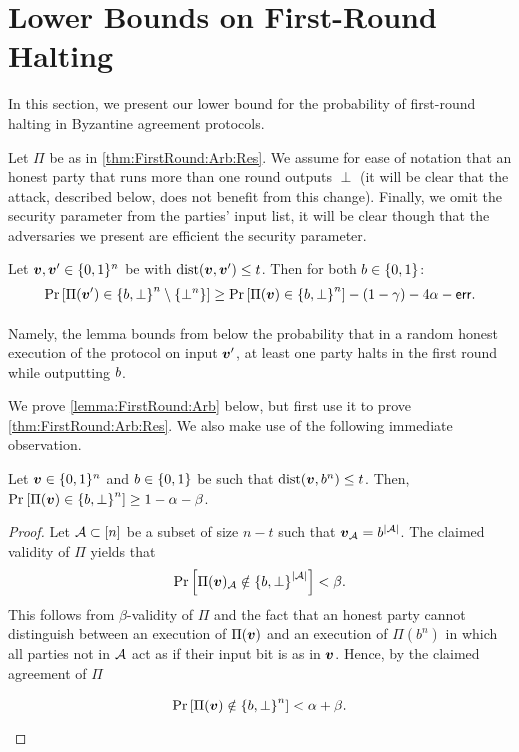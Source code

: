 

\section{Lower Bounds on First-Round Halting}\label{sec:FirstRound}

In this section, we present our lower bound for the probability of first-round halting in Byzantine agreement protocols.
\begin{theorem}\label{thm:FirstRound:Arb:Res}
\ThmFirstRoundArb
\end{theorem}

Let $\Pi$ be as in \cref{thm:FirstRound:Arb:Res}. We assume for ease of notation that an honest party that runs more than one round outputs $\perp$ (it will be clear that the attack, described  below, does not benefit from this change). Finally, we omit the security parameter from the parties' input list, it will be clear though that the adversaries we present are efficient \wrt the security parameter.


\begin{lemma}\label{lemma:FirstRound:Arb}
	Let ${ \boldsymbol{v}},{ \boldsymbol{v}}' \in {\{0,1\}^n}$ be with $\mathrm{dist}({ \boldsymbol{v}},{ \boldsymbol{v}}') \le t$. Then for both $b\in \{0,1\}$:
	\[
	\Pr_{}\left[\Pi({ \boldsymbol{v}}') \in  \left\{b,\bot\right\}^n  \setminus \left\{\bot^n\right\}\right] \ge	\Pr_{}\left[\Pi({ \boldsymbol{v}}) \in \left\{b,\bot\right\}^n\right] - (1- \gamma) - 4\alpha - \mathsf{err}.
	\]
\end{lemma}
Namely, the lemma bounds from below the probability that in a random honest execution of the protocol on input ${ \boldsymbol{v}}'$, at least one party halts in the first round while outputting $b$.

We prove \cref{lemma:FirstRound:Arb} below, but first use it to prove \cref{thm:FirstRound:Arb:Res}. We also make use of the following immediate observation.
\begin{claim}\label{claim:FirstRoundound:Arb:Validity}
Let ${ \boldsymbol{v}} \in {\{0,1\}^n}$  and $b \in \{0,1\}$ be such that $\mathrm{dist}({ \boldsymbol{v}},b^n) \le t$. Then,
$\Pr_{}\left[\Pi({ \boldsymbol{v}}) \in \left\{b,\bot\right\}^n\right] \ge 1 - \alpha - \beta$.
\end{claim}
\begin{proof}
Let $\mathcal{A} \subset [n]$ be a subset of size $n-t$ such that ${ \boldsymbol{v}}_{\mathcal{A}} = b^{\left|\mathcal{A}\right|}$. The claimed validity of $\Pi$ yields that
\begin{align*}
\Pr_{}\left[\Pi({ \boldsymbol{v}})_{\mathcal{A}} \notin \left\{b,\bot\right\}^{\left|\mathcal{A}\right|}\right] < \beta.
\end{align*}
This follows from $\beta$-validity of $\Pi$ and the fact that an honest party cannot distinguish between an execution of $\Pi({ \boldsymbol{v}})$ and an execution of $\Pi(b^n)$ in which all parties not in $\mathcal{A}$ act as if their input bit is as in ${ \boldsymbol{v}}$. Hence, by the claimed agreement of $\Pi$

\begin{align*}
\Pr_{}\left[\Pi({ \boldsymbol{v}}) \notin \left\{b,\bot\right\}^n\right] < \alpha + \beta.
\end{align*}
\end{proof}




